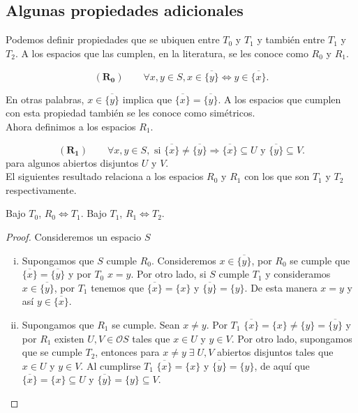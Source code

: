 \documentclass{comunicaciones}
\begin{document}
\subsection{Algunas propiedades adicionales}
Podemos definir propiedades que se ubiquen entre $T_0$ y $T_1$ y también entre $T_1$ y $T_2$. A los espacios que las cumplen, en la literatura, se les conoce como $R_0$ y $R_1$. 

\[
(\mathbf{R_0})\qquad \forall x, y\in S, x\in \overline{\{y\}} \Leftrightarrow y\in \overline{\{x\}}.
\]

En otras palabras, $x\in \overline{\{y\}}$ implica que $\overline{\{x\}}=\overline{\{y\}}$. A los espacios que cumplen con esta propiedad también se les conoce como simétricos.\\

Ahora definimos a los espacios $R_1$.

\[
(\mathbf{R_1})\qquad \forall x, y\in S, \mbox{ si } \overline{\{x\}}\neq \overline{\{y\}} \Rightarrow \overline{\{x\}}\subseteq U \mbox{ y } \overline{\{y\}}\subseteq V.
\]
para algunos abiertos disjuntos $U$ y $V$.\\

El siguientes resultado relaciona a los espacios $R_0$ y $R_1$ con los que son $T_1$ y $T_2$ respectivamente.

\begin{prop}\label{R0 y R1}
    Bajo $T_0$, $R_0 \Leftrightarrow T_1$. Bajo $T_1$, $R_1 \Leftrightarrow T_2$.
\end{prop}

\begin{proof}
Consideremos un espacio $S$
    \begin{enumerate}[i)]
        \item Supongamos que $S$ cumple $R_0$. Consideremos $x\in \overline{\{y\}}$, por $R_0$ se cumple que $\overline{\{x\}}=\overline{\{y\}}$ y por $T_0$ $x=y$. Por otro lado, si $S$ cumple $T_1$ y consideramos $x\in \overline{\{y\}}$, por $T_1$ tenemos que $\overline{\{x\}}=\{x\}$ y $\overline{\{y\}}=\{y\}$. De esta manera $x=y$ y así $y\in \overline{\{x\}}$.
        \item Supongamos que $R_1$ se cumple. Sean $x\neq y$. Por $T_1$ $\overline{\{x\}}=\{x\}\neq \{y\}=\overline{\{y\}}$ y por $R_1$ existen $U, V\in\mathcal{O}S$ tales que $x\in U$ y $y\in V$. Por otro lado, supongamos que se cumple $T_2$, entonces para $x\neq y \;\exists\; U, V$ abiertos disjuntos tales que $x\in U$ y $y\in V$. Al cumplirse $T_1$  $\overline{\{x\}}=\{x\}$ y $\overline{\{y\}}=\{y\}$, de aquí que $\overline{\{x\}}=\{x\}\subseteq U$ y $\overline{\{y\}}=\{y\}\subseteq V$.
    \end{enumerate}
\end{proof}
\end{document}
